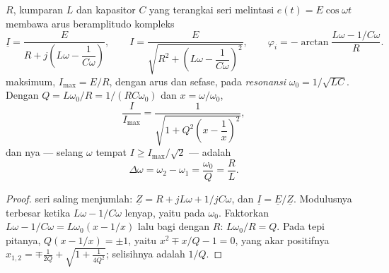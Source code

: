 \begin{theorem}\label{thm:b1:sinusoidal-impedance:resonance}
 $R$, kumparan $L$ dan kapasitor $C$ yang terangkai seri
melintasi $e(t) = E\cos\omega t$ membawa arus beramplitudo kompleks
\[
\underline I = \frac{E}{R + j\left(L\omega - \dfrac{1}{C\omega}\right)},
\qquad
I = \frac{E}{\sqrt{R^2 + \left(L\omega - \dfrac{1}{C\omega}\right)^2}},
\qquad
\varphi_i = -\arctan\frac{L\omega - 1/C\omega}{R} .
\]
 maksimum, $I_{\max} = E/R$, dengan arus dan 
sefase, pada \emph{resonansi} $\omega_0 = 1/\sqrt{LC}$. Dengan
$Q = L\omega_0/R = 1/(RC\omega_0)$ dan $x = \omega/\omega_0$,
\[
\frac{I}{I_{\max}} = \frac{1}{\sqrt{1 + Q^2\left(x - \dfrac1x\right)^2}} ,
\]
dan \emph{}nya --- selang $\omega$ tempat
$I \geq I_{\max}/\sqrt2$ --- adalah
\[
\Delta\omega = \omega_2 - \omega_1 = \frac{\omega_0}{Q} = \frac{R}{L} .
\]
\end{theorem}

\begin{proof}
 seri saling menjumlah: $\underline Z = R + jL\omega + 1/jC\omega$, dan
$\underline I = \underline E/\underline Z$. Modulusnya terbesar ketika
 $L\omega - 1/C\omega$ lenyap, yaitu pada $\omega_0$.
Faktorkan $L\omega - 1/C\omega = L\omega_0(x - 1/x)$ lalu bagi dengan $R$:
$L\omega_0/R = Q$. Pada tepi pitanya, $Q(x - 1/x) = \pm 1$, yaitu
$x^2 \mp x/Q - 1 = 0$, yang akar positifnya $x_{1,2} = \mp\frac{1}{2Q}
+ \sqrt{1 + \frac{1}{4Q^2}}$; selisihnya adalah $1/Q$.
\end{proof}


